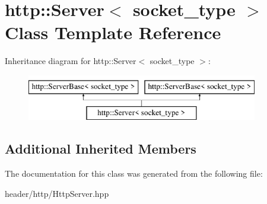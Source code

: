 \hypertarget{classhttp_1_1_server}{}\section{http\+:\+:Server$<$ socket\+\_\+type $>$ Class Template Reference}
\label{classhttp_1_1_server}
Inheritance diagram for http\+:\+:Server$<$ socket\+\_\+type $>$\+:\begin{figure}[H]
\begin{center}
\leavevmode
\includegraphics[height=2.000000cm]{d4/da8/classhttp_1_1_server}
\end{center}
\end{figure}
\subsection*{Additional Inherited Members}


The documentation for this class was generated from the following file\+:\begin{DoxyCompactItemize}
\item 
header/http/Http\+Server.\+hpp\end{DoxyCompactItemize}
